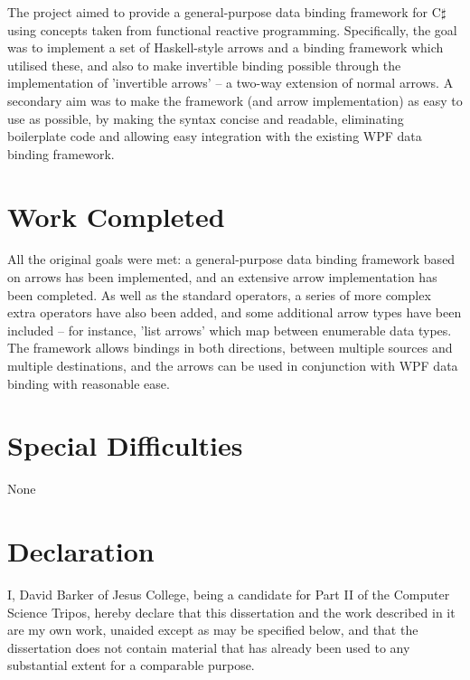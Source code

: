 \documentclass[12pt,twoside,notitlepage]{report}
\begin{document}
The project aimed to provide a general-purpose data binding framework for C$\sharp$ using concepts taken from functional reactive programming. Specifically, the goal was to implement a set of Haskell-style arrows and a binding framework which utilised these, and also to make invertible binding possible through the implementation of 'invertible arrows' -- a two-way extension of normal arrows. A secondary aim was to make the framework (and arrow implementation) as easy to use as possible, by making the syntax concise and readable, eliminating boilerplate code and allowing easy integration with the existing WPF data binding framework.

\section*{Work Completed}

All the original goals were met: a general-purpose data binding framework based on arrows has been implemented, and an extensive arrow implementation has been completed. As well as the standard operators, a series of more complex extra operators have also been added, and some additional arrow types have been included -- for instance, 'list arrows' which map between enumerable data types. The framework allows bindings in both directions, between multiple sources and multiple destinations, and the arrows can be used in conjunction with WPF data binding with reasonable ease.


\section*{Special Difficulties}

None
 
\newpage
\section*{Declaration}

I, David Barker of Jesus College, being a candidate for Part II of
the Computer Science Tripos, hereby declare that this dissertation
and the work described in it are my own work, unaided except as may
be specified below, and that the dissertation does not contain
material that has already been used to any substantial extent for a
comparable purpose.

\bigskip
{}

\medskip
{}
\end{document}
